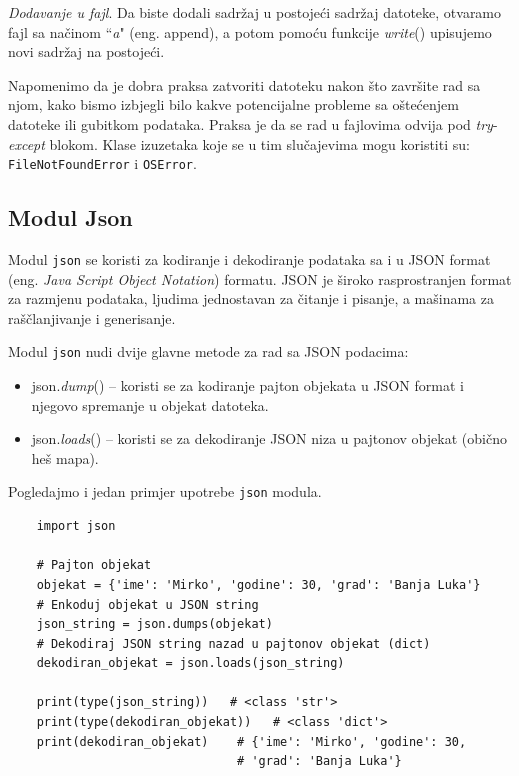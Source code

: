 \textit{Dodavanje u fajl}. Da biste dodali sadržaj u postojeći sadržaj datoteke, otvaramo fajl sa načinom ``\textit{a}" (eng. append), a potom pomoću funkcije \textit{write}() upisujemo novi sadržaj na postojeći. 

Napomenimo da je dobra praksa zatvoriti datoteku nakon što završite rad sa njom, kako bismo izbjegli bilo kakve potencijalne probleme sa oštećenjem datoteke ili gubitkom podataka. Praksa je da se rad u fajlovima odvija pod \textit{try}-\textit{except} blokom. Klase izuzetaka koje se u tim slučajevima mogu koristiti su: \texttt{FileNotFoundError} i \texttt{OSError}. 


\subsection{Modul Json}

Modul \texttt{json} se koristi  za kodiranje i dekodiranje podataka sa i u JSON format (eng. \textit{Java Script Object Notation}) formatu. JSON je  široko rasprostranjen format za razmjenu podataka, ljudima jednostavan za čitanje i pisanje, a mašinama za raščlanjivanje i generisanje.

Modul \texttt{json} nudi dvije glavne metode za rad sa JSON podacima:


\begin{itemize}
	\item json.\textit{dump}() -- koristi se za kodiranje pajton objekata u JSON format i njegovo spremanje u objekat  datoteka.
	\item json.\textit{loads}() -- koristi se za dekodiranje JSON niza u pajtonov objekat (obično heš mapa).
\end{itemize}

Pogledajmo i jedan primjer upotrebe \texttt{json} modula. 

\begin{verbatim}
	import json
	
	# Pajton objekat
	objekat = {'ime': 'Mirko', 'godine': 30, 'grad': 'Banja Luka'}
	# Enkoduj objekat u JSON string
	json_string = json.dumps(objekat)
	# Dekodiraj JSON string nazad u pajtonov objekat (dict)
	dekodiran_objekat = json.loads(json_string)
	
	print(type(json_string))   # <class 'str'>
	print(type(dekodiran_objekat))   # <class 'dict'>
	print(dekodiran_objekat)    # {'ime': 'Mirko', 'godine': 30,
		                        # 'grad': 'Banja Luka'}
\end{verbatim}


